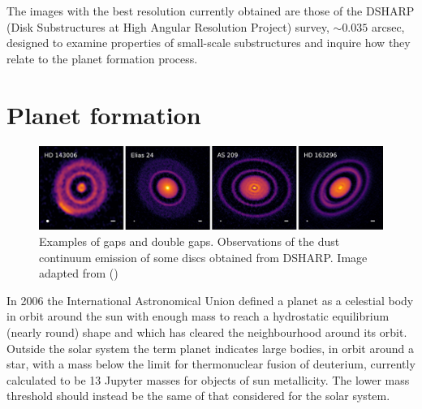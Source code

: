 \documentclass[a4paper,10pt]{report}
\begin{document}
The images with the best resolution currently obtained are those of the DSHARP (Disk Substructures at High Angular Resolution Project) survey, $\sim 0.035$ arcsec, designed to examine properties
of small-scale substructures and inquire how they relate to the planet formation process. 

\section{Planet formation}

\begin{figure}
    \begin{center}
        \includegraphics[width=\textwidth]{images/alma_pictures.jpg}
    \end{center}
    \caption{Examples of gaps and double gaps. 
    Observations of the dust continuum emission of some discs obtained from DSHARP.
    Image adapted from ()}
\end{figure}

In 2006 the International Astronomical Union defined a planet as a celestial body in orbit around the sun with enough mass 
to reach a hydrostatic equilibrium (nearly round) shape and which has cleared the neighbourhood around its orbit. Outside the solar system 
the term planet indicates large bodies, in orbit around a star,
with a mass below the limit for thermonuclear fusion of deuterium, 
currently calculated to be 13 Jupyter masses for objects of sun metallicity. The lower mass threshold should instead be the same of that considered
for the solar system.
\end{document}
